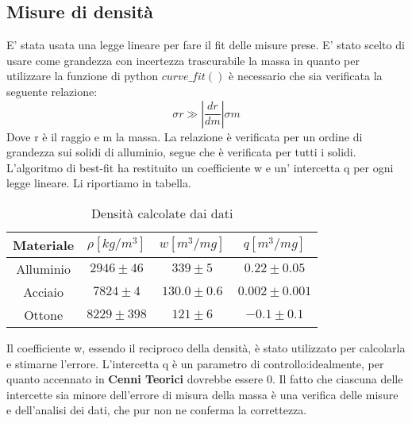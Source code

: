 \documentclass{article}
\begin{document}
\subsection{Misure di densità}
E' stata usata una legge lineare per fare il fit delle misure prese.
E' stato scelto di usare come grandezza con incertezza trascurabile la massa in quanto per utilizzare la funzione di python $curve\_fit()$ è necessario che sia verificata la seguente relazione:
\begin{equation}
\sigma r \gg \left|{ \frac{dr}{dm}}\right| \sigma m
\end{equation}
Dove r è il raggio e m la massa.
La relazione è verificata per un ordine di grandezza sui solidi di alluminio, segue che è verificata per tutti i solidi.
L'algoritmo di best-fit ha restituito un coefficiente w e un' intercetta q per ogni legge lineare.
Li riportiamo in tabella.
\begin{table}[H]
    \centering
    \begin{tabular}{|c|c|c|c|}
        \hline
        Materiale &$ \rho[kg/m^3]$ &$w [m^3/mg]$&$ q [m^3/mg]$ \\
        \hline
        Alluminio & $2946 \pm 46$ & $ 339\pm 5$ &$0.22\pm 0.05$\\
        Acciaio & $7824 \pm 4$ & $130.0 \pm0.6$ & $0.002\pm0.001$ \\
        Ottone & $8229\pm 398$ &  $121\pm 6$ &$ -0.1\pm0.1 $\\

        \hline
    \end{tabular}
    \caption{Densità calcolate dai dati}
    \label{tab:dati_sfere}
\end{table}
Il coefficiente w, essendo il reciproco della densità, è  stato utilizzato per calcolarla e stimarne l'errore.
L'intercetta q è un parametro di controllo:idealmente, per quanto accennato in \textbf{Cenni Teorici} dovrebbe essere 0.
Il fatto che ciascuna delle intercette sia minore dell'errore di misura della massa è una verifica delle misure e dell'analisi dei dati, che pur non ne conferma la correttezza.
\end{document}
